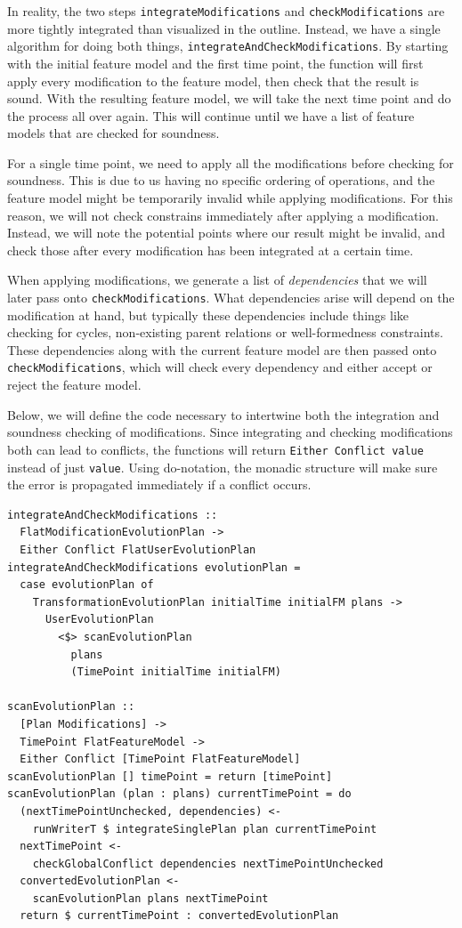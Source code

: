 \documentclass[a4paper,english]{ifimaster}
\begin{document}
In reality, the two steps \texttt{integrate\-Modifications} and \texttt{check\-Modifications} are more tightly integrated than visualized in the outline. Instead, we have a single algorithm for doing both things, \texttt{integrate\-And\-Check\-Modifications}. By starting with the initial feature model and the first time point, the function will first apply every modification to the feature model, then check that the result is sound. With the resulting feature model, we will take the next time point and do the process all over again. This will continue until we have a list of feature models that are checked for soundness.

For a single time point, we need to apply all the modifications before checking for soundness. This is due to us having no specific ordering of operations, and the feature model might be temporarily invalid while applying modifications. For this reason, we will not check constrains immediately after applying a modification. Instead, we will note the potential points where our result might be invalid, and check those after every modification has been integrated at a certain time.

When applying modifications, we generate a list of \textit{dependencies} that we will later pass onto \texttt{check\-Modifications}. What dependencies arise will depend on the modification at hand, but typically these dependencies include things like checking for cycles, non-existing parent relations or well-formedness constraints. These dependencies along with the current feature model are then passed onto \texttt{check\-Modifications}, which will check every dependency and either accept or reject the feature model.

Below, we will define the code necessary to intertwine both the integration and soundness checking of modifications. Since integrating and checking modifications both can lead to conflicts, the functions will return \texttt{Either Conflict value} instead of just \texttt{value}. Using do-notation, the monadic structure will make sure the error is propagated immediately if a conflict occurs.

\begin{verbatim}
integrateAndCheckModifications ::
  FlatModificationEvolutionPlan ->
  Either Conflict FlatUserEvolutionPlan
integrateAndCheckModifications evolutionPlan =
  case evolutionPlan of
    TransformationEvolutionPlan initialTime initialFM plans ->
      UserEvolutionPlan
        <$> scanEvolutionPlan
          plans
          (TimePoint initialTime initialFM)

scanEvolutionPlan ::
  [Plan Modifications] ->
  TimePoint FlatFeatureModel ->
  Either Conflict [TimePoint FlatFeatureModel]
scanEvolutionPlan [] timePoint = return [timePoint]
scanEvolutionPlan (plan : plans) currentTimePoint = do
  (nextTimePointUnchecked, dependencies) <-
    runWriterT $ integrateSinglePlan plan currentTimePoint
  nextTimePoint <-
    checkGlobalConflict dependencies nextTimePointUnchecked
  convertedEvolutionPlan <-
    scanEvolutionPlan plans nextTimePoint
  return $ currentTimePoint : convertedEvolutionPlan
\end{verbatim}
\end{document}
